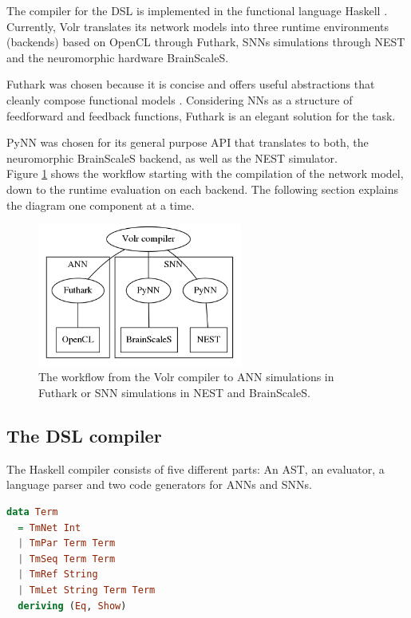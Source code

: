 The compiler for the \gls{DSL} is implemented in the functional language
Haskell \cite{Haskell}.
Currently, Volr translates its network models into three runtime
environments (backends) based on \gls{OpenCL} through Futhark,
\glspl{SNN} simulations through NEST and 
the neuromorphic hardware BrainScaleS.

Futhark was chosen because it is concise and offers
useful abstractions that cleanly compose functional
models \cite{Henriksen2017}.
Considering \glspl{NN} as a structure of feedforward and feedback functions,
Futhark is an elegant solution for the task.

PyNN was chosen for its general purpose API that translates to both, the
neuromorphic BrainScaleS  backend, as well as the NEST 
 simulator.
\\[0.2cm]
Figure \ref{fig:volr-architecture} shows the workflow starting with the
compilation of the network model, down to the runtime evaluation on each backend.
The following section explains the diagram one component at a time.

\begin{figure}
  \centering
  \includegraphics[width=0.6\textwidth]{images/volr-architecture.png}
  \caption{The workflow from the Volr compiler to 
    \gls{ANN} simulations in Futhark or \gls{SNN} simulations in NEST and
    \gls{BrainScaleS}.
  }
  \label{fig:volr-architecture}
\end{figure}

\subsection{The DSL compiler}
The Haskell compiler consists of five different parts:
An \gls{AST}, an evaluator, a language parser and two
code generators for \glspl{ANN} and \glspl{SNN}.

\lstset{mathescape=false,showstringspaces=false}
\begin{minipage}{\linewidth}
  \begin{lstlisting}[language=haskell, caption={The Volr AST in
  Haskell},label={code:term}]
data Term
  = TmNet Int 
  | TmPar Term Term
  | TmSeq Term Term
  | TmRef String
  | TmLet String Term Term
  deriving (Eq, Show)  
\end{lstlisting}
\end{minipage}

